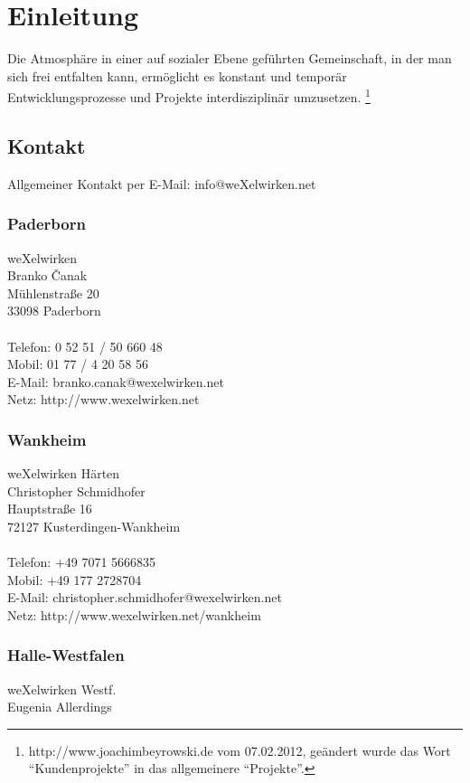 \chapter{Einleitung}
\glqq
Die Atmosphäre in einer auf sozialer Ebene geführten Gemeinschaft, in der man sich frei entfalten kann, ermöglicht es konstant und temporär Entwicklungsprozesse und Projekte interdisziplinär umzusetzen. 
\grqq \footnote{http://www.joachimbeyrowski.de vom 07.02.2012, geändert wurde das Wort "`Kundenprojekte"' in das allgemeinere "`Projekte"'.}
  \section{Kontakt}
Allgemeiner Kontakt per E-Mail: info@weXelwirken.net
    \subsection{Paderborn}
weXelwirken\\
Branko Čanak\\
Mühlenstraße 20\\
33098 Paderborn\\
\\
Telefon: 0 52 51 / 50 660 48\\
Mobil: 01 77 / 4 20 58 56\\
E-Mail: branko.canak@wexelwirken.net\\
Netz: http://www.wexelwirken.net\\
    \subsection{Wankheim}
weXelwirken Härten\\
Christopher Schmidhofer\\
Hauptstraße 16\\
72127 Kusterdingen-Wankheim\\
\\
Telefon: +49 7071 5666835\\
Mobil: +49 177 2728704\\
E-Mail: christopher.schmidhofer@wexelwirken.net\\
Netz: http://www.wexelwirken.net/wankheim\\
    \subsection{Halle-Westfalen}
weXelwirken Westf.\\
Eugenia Allerdings\\
